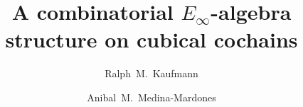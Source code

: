 \documentclass{amsart}
\title{A combinatorial $E_\infty$-algebra structure on cubical cochains}
\author[R.~Kaufmann]{Ralph~M.~Kaufmann}
\author{Anibal~M.~Medina-Mardones}
\begin{document}
%	
	\maketitle
%	
%	
	
	
	
	
	\sloppy
	\printbibliography
\end{document}
